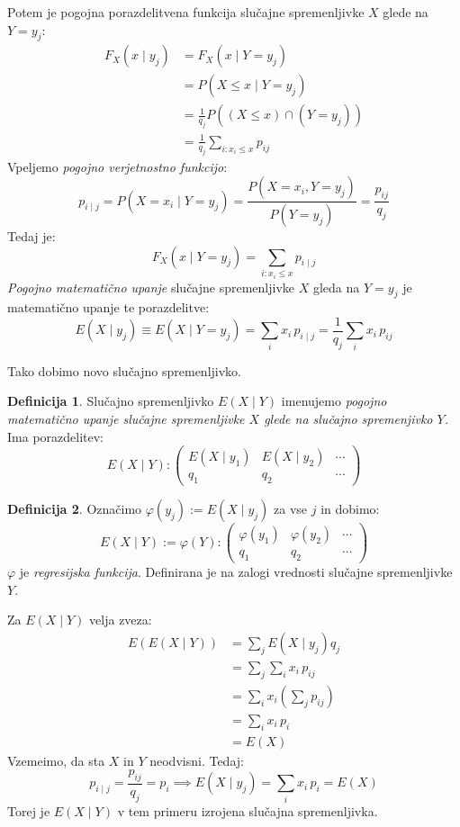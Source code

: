 \documentclass[12pt]{book}
\def\n{\noindent}
\theoremstyle{definition}
\newtheorem{definicija}{Definicija}
\theoremstyle{plain}
\theoremstyle{plain}
\theoremstyle{plain}
\theoremstyle{remark}
\begin{document}
\n Potem je pogojna porazdelitvena funkcija slučajne spremenljivke $X$ glede na $Y=y_j$: 
$$
\begin{aligned}
    F_X\left(x \mid y_j\right)&=F_X\left(x \mid Y=y_j\right) \\
    &=P\left(X \leq x \mid Y=y_j \right) \\
    &=\frac{1}{q_j} P\left((X \leq x) \cap\left(Y = y_j\right)\right) \\
    &=\frac{1}{q_j} \sum_{i : x_i \leq x} p_{i j}
\end{aligned}
$$
Vpeljemo \emph{pogojno verjetnostno funkcijo}:
$$
p_{i \mid j}=P\left(X=x_i \mid Y=y_j\right)=\frac{P\left(X=x_i, Y=y_j\right)}{P\left(Y=y_j\right)}=\frac{p_{i j}}{q_j}
$$
Tedaj je:
$$
F_X\left(x \mid Y=y_j\right)=\sum_{i: x_i \leq x} p_{i \mid j}
$$
\emph{Pogojno matematično upanje} slučajne spremenljivke $X$ gleda na $Y=y_j$ je matematično upanje te porazdelitve: 
$$
E\left(X \mid y_j\right) \equiv E\left(X \mid Y=y_j\right)=\sum_i x_i \, p_{i \mid j}=\frac{1}{q_j} \sum_i x_i \, p_{i j}
$$

\n Tako dobimo novo slučajno spremenljivko.

\begin{definicija}
    Slučajno spremenljivko $E(X \mid Y)$ imenujemo \emph{pogojno matematično upanje slučajne spremenljivke $X$ glede na slučajno spremenjivko $Y$.} Ima porazdelitev:
    $$
    E(X \mid Y):\left(\begin{array}{ccc}
        E\left(X \mid y_1\right) & E\left(X \mid y_2\right) & \cdots \\
        q_1 & q_2 & \cdots
        \end{array}\right)
    $$
\end{definicija}

\begin{definicija}
    Označimo $\varphi\left(y_j\right):=E\left(X \mid y_j\right)$ za vse $j$ in dobimo: 
    $$
    E(X \mid Y):=\varphi(Y):\left(\begin{array}{ccc}
        \varphi\left(y_1\right) & \varphi\left(y_2\right) & \cdots \\
        q_1 & q_2 & \cdots 
        \end{array}\right)
    $$
    $\varphi$ je \emph{regresijska funkcija}. Definirana je na zalogi vrednosti slučajne spremenljivke $Y$. 
\end{definicija}

\n Za $E(X \mid Y)$ velja zveza: 
$$
\begin{aligned}
    E(E(X \mid Y))&=\sum_j E\left(X \mid y_j\right) q_j \\
    &=\sum_j \sum_i x_i \, p_{i j} \\
    &=\sum_i x_i\left(\sum_j p_{i j}\right) \\
    &=\sum_i x_i \, p_i \\
    &=E(X)
\end{aligned}
$$
Vzemeimo, da sta $X$ in $Y$ neodvisni. Tedaj: 
$$
p_{i \mid j}=\frac{p_{i j}}{q_j}=p_i \implies E\left(X \mid y_j\right)=\sum_i x_i\, p_i=E(X)
$$
Torej je $E(X \mid Y)$ v tem primeru izrojena slučajna spremenljivka.
\end{document}
